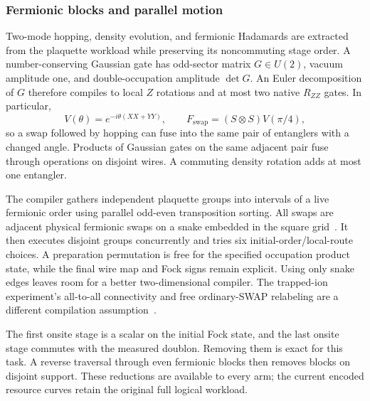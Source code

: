 \documentclass[11pt]{article}
\begin{document}
\subsubsection{Fermionic blocks and parallel motion}
Two-mode hopping, density evolution, and fermionic Hadamards are extracted
from the plaquette workload while preserving its noncommuting stage order.
A number-conserving Gaussian gate has odd-sector matrix $G\in U(2)$,
vacuum amplitude one, and double-occupation amplitude $\det G$. An Euler
decomposition of $G$ therefore compiles to local $Z$ rotations and at most
two native $R_{ZZ}$ gates. In particular,
\begin{equation}
 V(\theta)=e^{-i\theta(XX+YY)},\qquad
 F_{\mathrm{swap}}=(S\otimes S)V(\pi/4),
\end{equation}
so a swap followed by hopping can fuse into the same pair of entanglers with
a changed angle. Products of Gaussian gates on the same adjacent pair fuse
through operations on disjoint wires. A commuting density rotation adds at
most one entangler.

The compiler gathers independent plaquette groups into intervals of a live
fermionic order using parallel odd-even transposition sorting. All swaps are
adjacent physical fermionic swaps on a snake embedded in the square grid~\cite{kivlichan2018}. It then executes disjoint groups concurrently and tries
six initial-order/local-route choices. A preparation permutation is free for
the specified occupation product state, while the final wire map and Fock
signs remain explicit. Using only snake edges leaves room for a better
two-dimensional compiler. The trapped-ion experiment's all-to-all connectivity
and free ordinary-SWAP relabeling are a different compilation assumption~\cite{alam2025}.

The first onsite stage is a scalar on the initial Fock state, and the last
onsite stage commutes with the measured doublon. Removing them is exact for
this task. A reverse traversal through even fermionic blocks then removes
blocks on disjoint support. These reductions are available to every arm;
the current encoded resource curves retain the original full logical workload.
\end{document}
